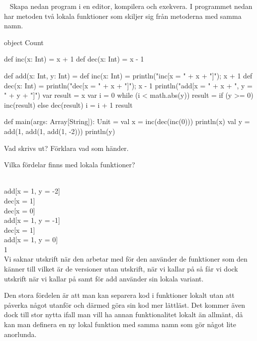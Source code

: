 \QUESTEND









\QUESTBEGIN

\Task  \what~  Skapa nedan program i en editor, kompilera och exekvera. I programmet nedan har metoden  två lokala funktioner som skiljer sig från metoderna med samma namn.
\begin{Code}
object Count {
  def inc(x: Int) = x + 1
  def dec(x: Int) = x - 1

  def add(x: Int, y: Int) = {
    def inc(x: Int) = {println("inc[x = " + x + "]"); x + 1}
    def dec(x: Int) = {println("dec[x = " + x + "]"); x - 1}
    println("add[x = " + x + ", y = " + y + "]")
    var result = x
    var i = 0
    while (i < math.abs(y)){
      result = if (y >= 0) inc(result) else dec(result)
      i = i + 1
    }
    result
  }

  def main(args: Array[String]): Unit = {
    val x =  inc(dec(inc(0)))
    println(x)
    val y = add(1, add(1, add(1, -2)))
    println(y)
  }
}
\end{Code}

\Subtask Vad skrivs ut? Förklara vad som händer.

\Subtask Vilka fördelar finns med lokala funktioner?


\SOLUTION


\TaskSolved \what


\\
add[x = 1, y = -2]\\
dec[x = 1]\\
dec[x = 0]\\
add[x = 1, y = -1]\\
dec[x = 1]\\
add[x = 1, y = 0]\\
1\\
Vi saknar utskrift när den arbetar med  för den använder de funktioner som den känner till vilket är de versioner utan utskrift, när vi kallar på  så får vi dock utskrift när vi kallar på  samt  för add använder sin lokala variant.

\SubtaskSolved
Den stora fördelen är att man kan separera kod i funktioner lokalt utan att påverka något utanför och därmed göra sin kod mer lättläst. Det kommer även dock till stor nytta ifall man vill ha annan funktionalitet lokalt än allmänt, då kan man definera en ny lokal funktion med samma namn som gör något lite anorlunda.



